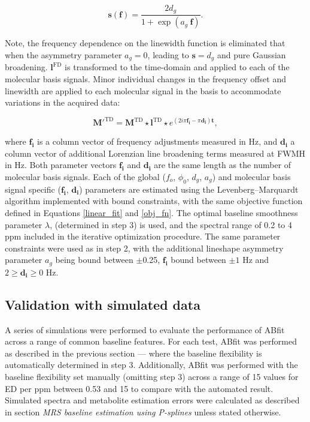 \documentclass[num-refs]{wiley-article}
\begin{document}
\begin{equation}
  \mathbf{s}(\mathbf{f}) = \frac{2 d_{g}}{1 + \exp(a_{g} \ \mathbf{f})}.
\end{equation}

Note, the frequency dependence on the linewidth function is eliminated that when the asymmetry parameter $a_{g}=0$, leading to $\mathbf{s}=d_{g}$ and pure Gaussian broadening. $\mathbf{l}^{\mathrm{FD}}$ is transformed to the time-domain and applied to each of the molecular basis signals. Minor individual changes in the frequency offset and linewidth are applied to each molecular signal in the basis to accommodate variations in the acquired data:

\begin{equation}
  \mathbf{M}'^{\mathrm{TD}} = \mathbf{M}^{\mathrm{TD}} \star \mathbf{l}^{\mathrm{TD}} \star e^{(2i \pi \mathbf{f_{i}} - \pi \mathbf{d_{i}} ) \mathbf{t}},
\end{equation}

where $\mathbf{f_{i}}$ is a column vector of frequency adjustments measured in Hz, and $\mathbf{d_{i}}$ a column vector of additional Lorenzian line broadening terms measured at FWMH in Hz. Both parameter vectors $\mathbf{f_{i}}$ and $\mathbf{d_{i}}$ are the same length as the number of molecular basis signals. Each of the global ($f_{o}$, $\phi_{0}$, $d_{g}$, $a_{g}$) and molecular basis signal specific ($\mathbf{f_{i}}$, $\mathbf{d_{i}}$) parameters are estimated using the Levenberg–Marquardt algorithm \cite{Levenberg1944} implemented with bound constraints, with the same objective function defined in Equations \ref{linear_fit} and \ref{obj_fn}. The optimal baseline smoothness parameter $\lambda$, (determined in step 3) is used, and the spectral range of 0.2 to 4 ppm included in the iterative optimization procedure. The same parameter constraints were used as in step 2, with the additional lineshape asymmetry parameter $a_{g}$ being bound between $\pm$0.25, $\mathbf{f_{i}}$ bound between $\pm1$ Hz and  $2 \geq \mathbf{d_{i}} \geq 0$ Hz.

\subsection{Validation with simulated data}
A series of simulations were performed to evaluate the performance of ABfit across a range of common baseline features. For each test, ABfit was performed as described in the previous section --- where the baseline flexibility is automatically determined in step 3. Additionally, ABfit was performed with the baseline flexibility set manually (omitting step 3) across a range of 15 values for ED per ppm between 0.53 and 15 to compare with the automated result. Simulated spectra and metabolite estimation errors were calculated as described in section \textit{MRS baseline estimation using P-splines} unless stated otherwise.
\end{document}
